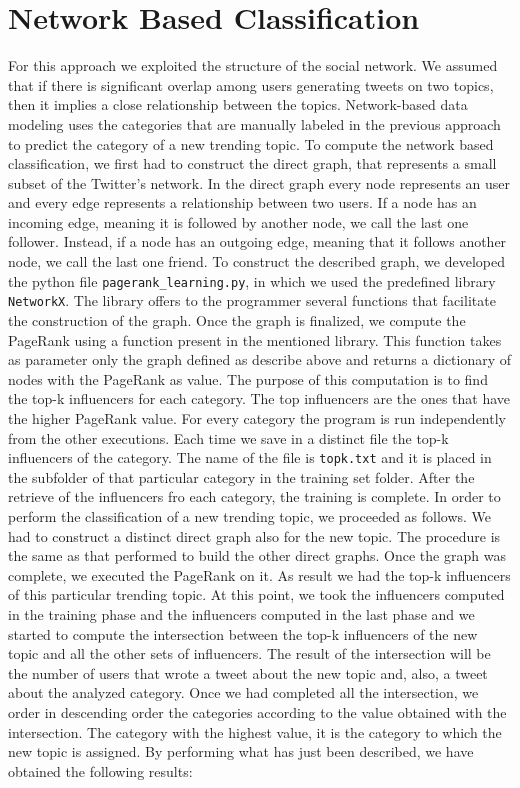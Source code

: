 \documentclass[journal,11pt]{vgtc}
\begin{document}
\section{Network Based Classification}
For this approach we exploited the structure of the social network. We assumed that if there is significant overlap among users 
generating tweets on two topics, then it implies a close relationship between the topics.
Network-based data modeling uses the categories that are manually labeled in the previous approach to predict
the category of a new trending topic.
To compute the network based classification, we first had to construct the direct graph, that represents a small 
subset of the Twitter's network. 
In the direct graph every node represents an user and every edge represents a relationship between two users.
If a node has an incoming edge, meaning it is followed by another node, we call the last one follower. Instead, if a node has an 
outgoing edge, meaning that it follows another node, we call the last one friend.
To construct the described graph, we developed the python file \texttt{pagerank\_learning.py}, in which we used the predefined library \texttt{NetworkX}. The library offers to the programmer 
several functions that facilitate the construction of the graph. 
Once the graph is finalized, we compute the PageRank using a function present in the mentioned library. 
This function takes as parameter only the graph defined as describe above and returns a dictionary of nodes 
with the PageRank as value. 
The purpose of this computation is to find the top-k influencers for each category. The top influencers
are the ones that have the higher PageRank value.
For every category the program is run independently from the other executions. Each time we save in a 
distinct file the top-k influencers of the category. The name of the file is 
\texttt{topk.txt} and it is placed in the subfolder of that particular category in the training set folder.
After the retrieve of the influencers fro each category, the training is complete. 
In order to perform the classification of a new trending topic, we proceeded as follows. 
We had to construct a distinct direct graph also for the new topic. The procedure is the same as that performed
to build the other direct graphs. Once the graph was complete, we executed the PageRank on it. 
As result we had the top-k influencers of this particular trending topic. 
At this point, we took the influencers computed in the training phase and the influencers computed in the
last phase and we started to compute the intersection between the top-k influencers of the new topic and 
all the other sets of influencers. 
The result of the intersection will be the number of users that wrote a tweet about the new topic and, also, 
a tweet about the analyzed category. 
Once we had completed all the intersection, we order in descending order the categories according to the 
value obtained with the intersection. The category with the highest value, it is the category
to which the new topic is assigned.
By performing what has just been described, we have obtained the following results:




\end{document}
